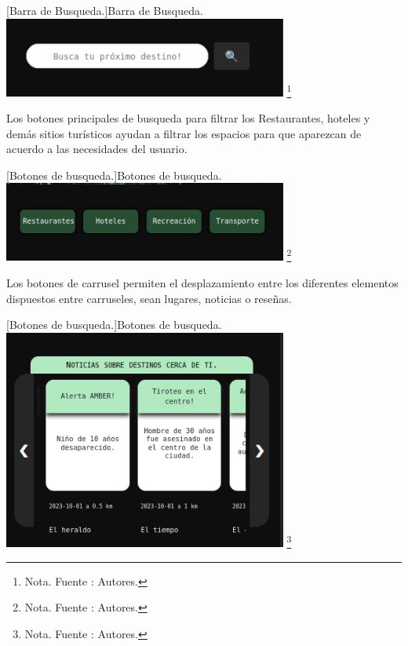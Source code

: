      \vspace{2mm}
    \begin{minipage}{0.9\textwidth}
    \centering
    [{Barra de Busqueda.}]{Barra de Busqueda.}
    \label{ManualBarraNavegacion}
    \includegraphics[width=0.7\textwidth]{Content/Images/ManualBarraBusqueda.png}
    \footnote{Nota. \textup{Fuente : Autores.}}
    \end{minipage}


    Los botones principales de busqueda para filtrar los Restaurantes, hoteles y demás sitios turísticos ayudan a filtrar los espacios para que aparezcan de acuerdo a las necesidades del usuario.

      \vspace{2mm}
    \begin{minipage}{0.9\textwidth}
    \centering
    [{Botones de busqueda.}]{Botones de busqueda.}
    \label{ManualBarraNavegacion}
    \includegraphics[width=0.7\textwidth]{Content/Images/ManualBotonesDeBusqueda.png}
    \footnote{Nota. \textup{Fuente : Autores.}}
    \end{minipage}

    Los botones de carrusel permiten el desplazamiento entre los diferentes elementos dispuestos entre carruseles, sean lugares, noticias o reseñas.

      \vspace{2mm}
    \begin{minipage}{0.9\textwidth}
    \centering
    [{Botones de busqueda.}]{Botones de busqueda.}
    \label{ManualBarraNavegacion}
    \includegraphics[width=0.7\textwidth]{Content/Images/ManualFlechasCarrusel.png}
    \footnote{Nota. \textup{Fuente : Autores.}}
    \end{minipage}


